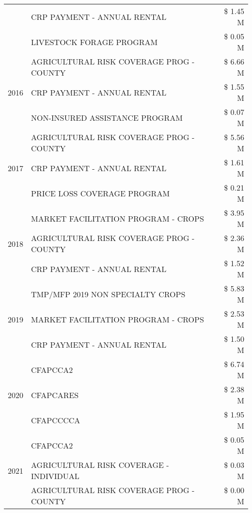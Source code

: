 \begin{tabular}{llr}
 & CRP PAYMENT - ANNUAL RENTAL & \$ 1.45 M \\
 & LIVESTOCK FORAGE PROGRAM & \$ 0.05 M \\
\cline{1-3}
\multirow[t]{3}{*}{2016} & AGRICULTURAL RISK COVERAGE PROG - COUNTY & \$ 6.66 M \\
 & CRP PAYMENT - ANNUAL RENTAL & \$ 1.55 M \\
 & NON-INSURED ASSISTANCE PROGRAM & \$ 0.07 M \\
\cline{1-3}
\multirow[t]{3}{*}{2017} & AGRICULTURAL RISK COVERAGE PROG - COUNTY & \$ 5.56 M \\
 & CRP PAYMENT - ANNUAL RENTAL & \$ 1.61 M \\
 & PRICE LOSS COVERAGE PROGRAM & \$ 0.21 M \\
\cline{1-3}
\multirow[t]{3}{*}{2018} & MARKET FACILITATION PROGRAM - CROPS & \$ 3.95 M \\
 & AGRICULTURAL RISK COVERAGE PROG - COUNTY & \$ 2.36 M \\
 & CRP PAYMENT - ANNUAL RENTAL & \$ 1.52 M \\
\cline{1-3}
\multirow[t]{3}{*}{2019} & TMP/MFP 2019 NON SPECIALTY CROPS & \$ 5.83 M \\
 & MARKET FACILITATION PROGRAM - CROPS & \$ 2.53 M \\
 & CRP PAYMENT - ANNUAL RENTAL & \$ 1.50 M \\
\cline{1-3}
\multirow[t]{3}{*}{2020} & CFAPCCA2 & \$ 6.74 M \\
 & CFAPCARES & \$ 2.38 M \\
 & CFAPCCCCA & \$ 1.95 M \\
\cline{1-3}
\multirow[t]{3}{*}{2021} & CFAPCCA2 & \$ 0.05 M \\
 & AGRICULTURAL RISK COVERAGE - INDIVIDUAL & \$ 0.03 M \\
 & AGRICULTURAL RISK COVERAGE PROG - COUNTY & \$ 0.00 M \\
\cline{1-3}
\bottomrule
\end{tabular}
